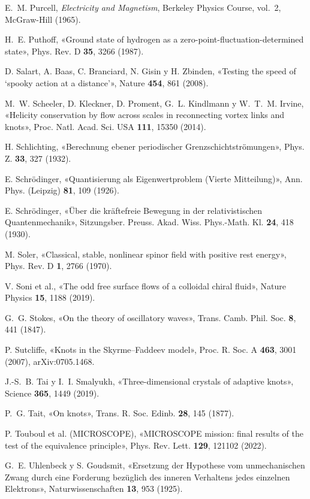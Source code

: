 \documentclass[11pt,a4paper]{article}
\begin{document}
\begin{list}{}{\setlength{\leftmargin}{1.5em}\setlength{\itemindent}{-1.5em}\setlength{\itemsep}{0.15em}\small}
\item E.~M. Purcell, \emph{Electricity and Magnetism}, Berkeley Physics Course, vol.~2, McGraw-Hill (1965).
\item H.~E. Puthoff, «Ground state of hydrogen as a zero-point-fluctuation-determined state», Phys. Rev. D \textbf{35}, 3266 (1987).
\item D. Salart, A. Baas, C. Branciard, N. Gisin y H. Zbinden, «Testing the speed of ‘spooky action at a distance’», Nature \textbf{454}, 861 (2008).
\item M.~W. Scheeler, D. Kleckner, D. Proment, G.~L. Kindlmann y W.~T.~M. Irvine, «Helicity conservation by flow across scales in reconnecting vortex links and knots», Proc. Natl. Acad. Sci. USA \textbf{111}, 15350 (2014).
\item H. Schlichting, «Berechnung ebener periodischer Grenzschichtströmungen», Phys. Z. \textbf{33}, 327 (1932).
\item E. Schrödinger, «Quantisierung als Eigenwertproblem (Vierte Mitteilung)», Ann. Phys. (Leipzig) \textbf{81}, 109 (1926).
\item E. Schrödinger, «Über die kräftefreie Bewegung in der relativistischen Quantenmechanik», Sitzungsber. Preuss. Akad. Wiss. Phys.-Math. Kl. \textbf{24}, 418 (1930).
\item M. Soler, «Classical, stable, nonlinear spinor field with positive rest energy», Phys. Rev. D \textbf{1}, 2766 (1970).
\item V. Soni et al., «The odd free surface flows of a colloidal chiral fluid», Nature Physics \textbf{15}, 1188 (2019).
\item G.~G. Stokes, «On the theory of oscillatory waves», Trans. Camb. Phil. Soc. \textbf{8}, 441 (1847).
\item P. Sutcliffe, «Knots in the Skyrme--Faddeev model», Proc. R. Soc. A \textbf{463}, 3001 (2007), arXiv:0705.1468.
\item J.-S.~B. Tai y I.~I. Smalyukh, «Three-dimensional crystals of adaptive knots», Science \textbf{365}, 1449 (2019).
\item P.~G. Tait, «On knots», Trans. R. Soc. Edinb. \textbf{28}, 145 (1877).
\item P. Touboul et al. (MICROSCOPE), «MICROSCOPE mission: final results of the test of the equivalence principle», Phys. Rev. Lett. \textbf{129}, 121102 (2022).
\item G.~E. Uhlenbeck y S. Goudsmit, «Ersetzung der Hypothese vom unmechanischen Zwang durch eine Forderung bezüglich des inneren Verhaltens jedes einzelnen Elektrons», Naturwissenschaften \textbf{13}, 953 (1925).

\end{list}
\end{document}
